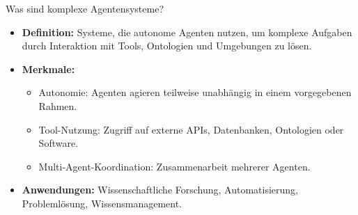 \documentclass[aspectratio=1610, xcolor=dvipsnames, 9pt]{beamer}
\begin{document}
\begin{frame}{Was sind komplexe Agentensysteme?}
  \begin{itemize}
    \item \textbf{Definition:} Systeme, die autonome Agenten nutzen, um komplexe Aufgaben durch Interaktion mit Tools, Ontologien und Umgebungen zu lösen.
    \item \textbf{Merkmale:}
      \begin{itemize}
        \item Autonomie: Agenten agieren teilweise unabhängig in einem vorgegebenen Rahmen.
        \item Tool-Nutzung: Zugriff auf externe APIs, Datenbanken, Ontologien oder Software.
        \item Multi-Agent-Koordination: Zusammenarbeit mehrerer Agenten.
      \end{itemize}
    \item \textbf{Anwendungen:} Wissenschaftliche Forschung, Automatisierung, Problemlösung, Wissensmanagement.
  \end{itemize}
\end{frame}
\end{document}

